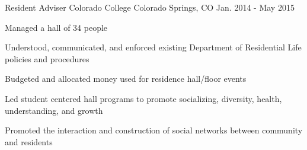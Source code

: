\begin{cventries}
\vspace{-1.25em}
\cventry
{Resident Adviser} %
{Colorado College} %
{Colorado Springs, CO} %
{Jan. 2014 - May 2015} %
{ %
\begin{cvitems}
\item{Managed a hall of 34 people}
\item{Understood, communicated, and enforced existing Department of Residential Life policies and procedures}
\item{Budgeted and allocated money used for residence hall/floor events}
\item{Led student centered hall programs to promote socializing, diversity, health, understanding, and growth}
\item{Promoted the interaction and construction of social networks between community and residents}
\end{cvitems} 
}






\end{cventries}
